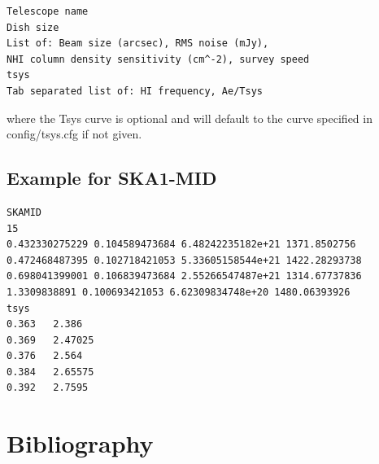 \documentclass[11pt]{article}
\begin{document}
\begin{verbatim}
Telescope name
Dish size
List of: Beam size (arcsec), RMS noise (mJy), 
NHI column density sensitivity (cm^-2), survey speed
tsys
Tab separated list of: HI frequency, Ae/Tsys
\end{verbatim}
where the Tsys curve is optional and will default to the curve specified in config/tsys.cfg if not given. \subsection{Example for SKA1-MID}
\begin{verbatim}
SKAMID
15 
0.432330275229 0.104589473684 6.48242235182e+21 1371.8502756
0.472468487395 0.102718421053 5.33605158544e+21 1422.28293738
0.698041399001 0.106839473684 2.55266547487e+21 1314.67737836
1.3309838891 0.100693421053 6.62309834748e+20 1480.06393926
tsys
0.363	2.386
0.369	2.47025
0.376	2.564
0.384	2.65575
0.392	2.7595
\end{verbatim}

\section{Bibliography}
\printbibliography
\end{document}
